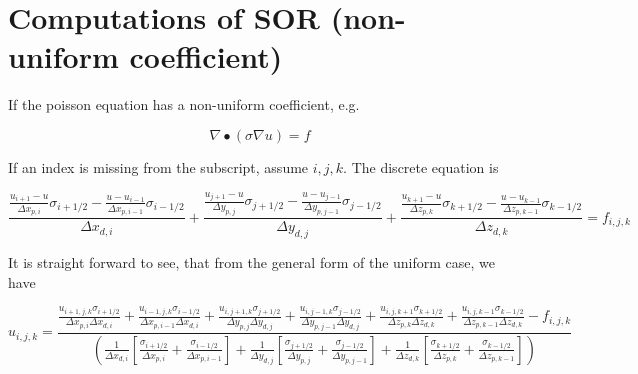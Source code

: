 \documentclass[11pt]{article}
\begin{document}
\section{Computations of SOR (non-uniform coefficient)}

If the poisson equation has a non-uniform coefficient, e.g.

\begin{equation}
	\nabla \bullet \left( \sigma \nabla u \right) = f
\end{equation}

If an index is missing from the subscript, assume $i,j,k$. The discrete equation is

\begin{equation}
	\frac{\frac{u_{i+1}-u}{\Delta x_{p,i}} \sigma_{i+1/2} - \frac{u-u_{i-1}}{\Delta x_{p,i-1}} \sigma_{i-1/2}}{\Delta x_{d,i}} + 
	\frac{\frac{u_{j+1}-u}{\Delta y_{p,j}} \sigma_{j+1/2} - \frac{u-u_{j-1}}{\Delta y_{p,j-1}} \sigma_{j-1/2}}{\Delta y_{d,j}} +
	\frac{\frac{u_{k+1}-u}{\Delta z_{p,k}} \sigma_{k+1/2} - \frac{u-u_{k-1}}{\Delta z_{p,k-1}} \sigma_{k-1/2}}{\Delta z_{d,k}} = f_{i,j,k}
\end{equation}

It is straight forward to see, that from the general form of the uniform case, we have


\begin{equation}
	u_{i,j,k} = 
	\frac{ 
	\frac{u_{i+1,j,k} \sigma_{i+1/2}}{\Delta x_{p,i} \Delta x_{d,i}} + \frac{u_{i-1,j,k}\sigma_{i-1/2}}{\Delta x_{p,i-1} \Delta x_{d,i}} + 
	\frac{u_{i,j+1,k} \sigma_{j+1/2}}{\Delta y_{p,j} \Delta y_{d,j}} + \frac{u_{i,j-1,k}\sigma_{j-1/2}}{\Delta y_{p,j-1} \Delta y_{d,j}} +
	\frac{u_{i,j,k+1} \sigma_{k+1/2}}{\Delta z_{p,k} \Delta z_{d,k}} + \frac{u_{i,j,k-1}\sigma_{k-1/2}}{\Delta z_{p,k-1} \Delta z_{d,k}}
	- f_{i,j,k} }{
	\left( 
	\frac{ 1 }{ \Delta x_{d,i} }
	\left[
	\frac{ \sigma_{i+1/2} }{ \Delta x_{p,i} } +
	\frac{ \sigma_{i-1/2} }{ \Delta x_{p,i-1} }
	\right] +
	\frac{ 1 }{ \Delta y_{d,j} }
	\left[
	\frac{ \sigma_{j+1/2} }{ \Delta y_{p,j} } +
	\frac{ \sigma_{j-1/2} }{ \Delta y_{p,j-1} }
	\right] +
	\frac{ 1 }{ \Delta z_{d,k} }
	\left[
	\frac{ \sigma_{k+1/2} }{ \Delta z_{p,k} } +
	\frac{ \sigma_{k-1/2} }{ \Delta z_{p,k-1} }
	\right]
	\right)
	}
\end{equation}
\end{document}
